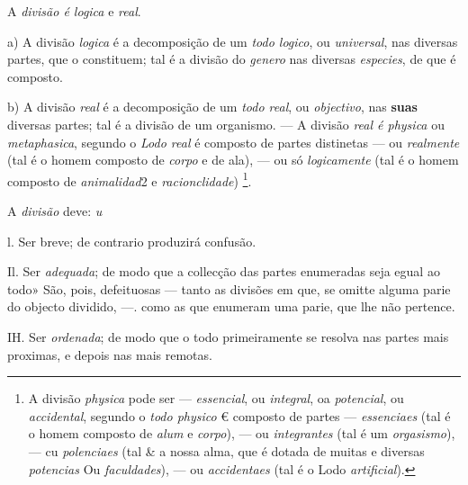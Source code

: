 
A \emph{divisão é logica} e \emph{real}.

a) A divisão \emph{logica} é a decomposição de um \emph{todo logico}, ou \emph{universal}, nas diversas partes, que o constituem; tal é a divisão do \emph{genero} nas diversas \emph{especies}, de que é composto.

b) A divisão \emph{real} é a decomposição de um \emph{todo real}, ou \emph{objectivo}, nas \textbf{suas} diversas partes; tal é a divisão de um organismo. --- A divisão \emph{real é physica} ou \emph{metaphasica}, segundo o \emph{Lodo real} é composto de partes distinetas --- ou \emph{realmente} (tal é   o homem composto de \emph{corpo} e de ala), --- ou só \emph{logicamente} (tal é o homem composto de \emph{animalidad}2 e \emph{racionclidade}) \footnote{A divisão \emph{physica} pode ser --- \emph{essencial}, ou \emph{integral}, oa \emph{potencial}, ou \emph{accidental}, segundo o \emph{todo physico} € composto de partes --- \emph{essenciaes} (tal é o homem composto de \emph{alum} e \emph{corpo}), --- ou \emph{integrantes} (tal é um \emph{orgasismo}), --- cu \emph{polenciaes} (tal \& a nossa alma, que é dotada de muitas e diversas \emph{potencias} Ou \emph{faculdades}), --- ou \emph{accidentaes} (tal é o Lodo \emph{artificial}).}.


A \emph{divisão} deve: \emph{u}

l. Ser breve; de contrario produzirá confusão.

Il. Ser \emph{adequada}; de modo que a collecção das partes enumeradas seja egual ao todo» São, pois, defeituosas --- tanto as divisões em que, se omitte alguma parie do objecto dividido, ---. como as que enumeram uma parie, que lhe não pertence.

IH. Ser \emph{ordenada}; de modo que o todo primeiramente se resolva nas partes mais proximas, e depois nas mais remotas.


